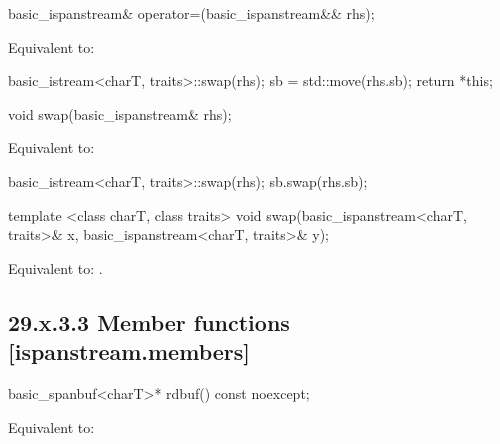 \documentclass[ebook,11pt,article]{memoir}
\begin{document}
\begin{itemdecl}
basic_ispanstream& operator=(basic_ispanstream&& rhs);
\end{itemdecl}

\begin{itemdescr}
\pnum
\effects Equivalent to:
\begin{codeblock}
   basic_istream<charT, traits>::swap(rhs);
   sb = std::move(rhs.sb);
   return *this;
\end{codeblock}
\end{itemdescr}

\begin{itemdecl}
void swap(basic_ispanstream& rhs);
\end{itemdecl}

\begin{itemdescr}
\pnum
\effects Equivalent to:
\begin{codeblock}
    basic_istream<charT, traits>::swap(rhs);
    sb.swap(rhs.sb);
\end{codeblock}
\end{itemdescr}


\begin{itemdecl}
template <class charT, class traits>
  void swap(basic_ispanstream<charT, traits>& x,
            basic_ispanstream<charT, traits>& y);
\end{itemdecl}

\begin{itemdescr}
\pnum
\effects Equivalent to: 
.
\end{itemdescr}

\subsection{29.x.3.3 Member functions [ispanstream.members]}
\label{ispanstream.members}

\begin{itemdecl}
basic_spanbuf<charT>* rdbuf() const noexcept;
\end{itemdecl}

\begin{itemdescr}
\pnum
\effects Equivalent to:\\
\end{itemdescr}
\end{document}
